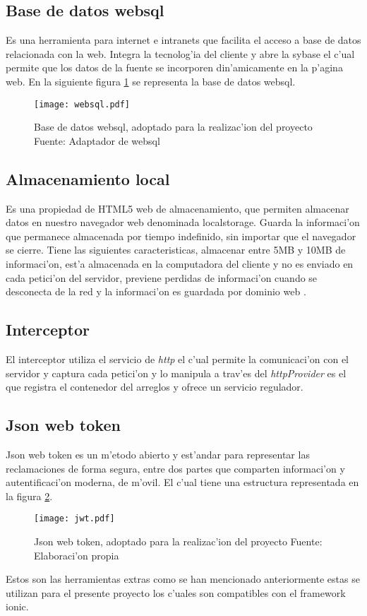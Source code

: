 
\subsection{Base de datos websql}
Es una herramienta para internet e intranets que facilita el acceso a base de datos relacionada con la web. Integra la tecnolog'ia  del cliente y abre la sybase el c'ual permite que los datos de la fuente se incorporen din'amicamente en la p'agina web. En la siguiente figura \ref{fig:websql} se representa la base de datos websql.
\begin{figure}[H]
\centering
\texttt{[image: websql.pdf]}
\captionsetup{justification=centering,margin=2cm}
\caption{Base de datos websql, adoptado para la realizac'ion del proyecto Fuente: Adaptador de websql \cite{Websql1997}}
\label{fig:websql}
\end{figure}

\subsection{Almacenamiento local}
Es una propiedad de HTML5 web de almacenamiento, que permiten almacenar datos en nuestro navegador web denominada localstorage.
Guarda la informaci'on que permanece almacenada por tiempo indefinido, sin importar que el navegador se cierre. Tiene las siguientes caracteristicas, almacenar entre 5MB y 10MB de informaci'on, est'a almacenada en la computadora del cliente y no es enviado en cada petici'on del servidor, previene perdidas de informaci'on cuando se desconecta de la red y la informaci'on es guardada por dominio web \cite{Cardenas2015}.
\subsection{Interceptor}                                                                                                                                                                                                                                              
El interceptor utiliza el servicio de \textit{http} el c'ual permite la comunicaci'on con el servidor y captura cada petici'on y lo manipula a trav'es del \textit{httpProvider} es el que registra el contenedor del arreglos y ofrece un servicio regulador.
\subsection{Json web token}
Json web token es un m'etodo abierto y est'andar para representar las  reclamaciones de forma segura, entre dos partes que comparten informaci'on y autentificaci'on moderna, de m'ovil. El c'ual tiene una estructura representada en la figura \ref{fig:jwt}.
\begin{figure}[H]
\centering
\texttt{[image: jwt.pdf]}
\captionsetup{justification=centering,margin=2cm}
\caption{Json web token, adoptado para la realizac'ion del proyecto Fuente: Elaboraci'on propia}
\label{fig:jwt}
\end{figure}

Estos son las herramientas extras como se han mencionado anteriormente estas se utilizan para el presente proyecto los c'uales son compatibles con el framework ionic.